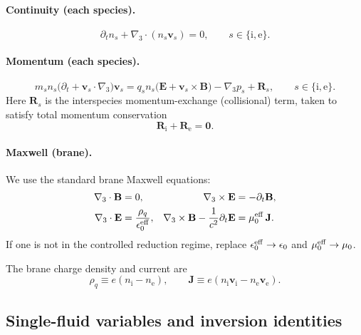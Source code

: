 \documentclass[11pt]{article}
\newcommand{\gradthree}{\nabla_3}
\newcommand{\ion}{\mathrm{i}}
\newcommand{\ele}{\mathrm{e}}
\begin{document}
\paragraph{Continuity (each species).}
\begin{equation}
\partial_t n_s + \gradthree\cdot(n_s \mathbf{v}_s)=0,
\qquad s\in\{\ion,\ele\}.
\label{eq:app_species_cont}
\end{equation}

\paragraph{Momentum (each species).}
\begin{equation}
m_s n_s\Big(\partial_t + \mathbf{v}_s\cdot\gradthree\Big)\mathbf{v}_s
=
q_s n_s\Big(\mathbf{E} + \mathbf{v}_s\times\mathbf{B}\Big)
-\gradthree p_s
+\mathbf{R}_s,
\qquad s\in\{\ion,\ele\}.
\label{eq:app_species_mom}
\end{equation}
Here \(\mathbf{R}_s\) is the interspecies momentum-exchange (collisional) term, taken
to satisfy total momentum conservation
\begin{equation}
\mathbf{R}_\ion + \mathbf{R}_\ele = \mathbf{0}.
\label{eq:app_drag_sum_zero}
\end{equation}

\paragraph{Maxwell (brane).}
We use the standard brane Maxwell equations:
\begin{align}
\gradthree\cdot\mathbf{B} &= 0,
&
\gradthree\times\mathbf{E} &= -\partial_t\mathbf{B},
\label{eq:app_maxwell_hom}
\\
\gradthree\cdot\mathbf{E} &= \frac{\rho_q}{\epsilon_0^{\rm eff}},
&
\gradthree\times\mathbf{B} - \frac{1}{c^2}\partial_t\mathbf{E}
&= \mu_0^{\rm eff}\,\mathbf{J}.
\label{eq:app_maxwell_inhom}
\end{align}
If one is not in the controlled reduction regime, replace \(\epsilon_0^{\rm eff}\to\epsilon_0\)
and \(\mu_0^{\rm eff}\to\mu_0\).

The brane charge density and current are
\begin{equation}
\rho_q \equiv e(n_\ion - n_\ele),
\qquad
\mathbf{J} \equiv e(n_\ion\mathbf{v}_\ion - n_\ele\mathbf{v}_\ele).
\label{eq:app_rhoq_J_def}
\end{equation}

\subsection{Single-fluid variables and inversion identities}
\label{app:single_fluid_defs}
\end{document}
